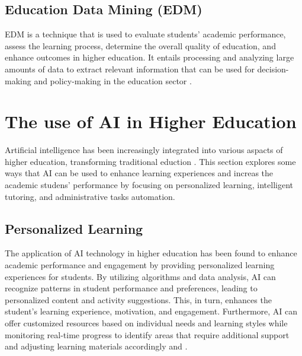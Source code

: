 \subsection{Education Data Mining (EDM)}
EDM is a technique that is used to evaluate students' academic performance,
assess the learning process, determine the overall quality of education, and enhance outcomes in higher education.
It entails processing and analyzing large amounts of data to extract relevant information that can be used for
decision-making and policy-making in the education sector \citep{arifin_using_2022}.


\section{The use of AI in Higher Education }\label{use-ai}
\justifying
Artificial intelligence has been increasingly integrated into various aspacts of higher
education, transforming traditional eduction \citep{wang_exploring_2023}. This section explores
some ways that AI can be used to enhance learning experiences and increas the academic studens' performance
by focusing on  personalized learning, intelligent tutoring, and administrative tasks automation.

\subsection{Personalized Learning}
The application of AI technology in higher education has been found to enhance academic performance and
engagement by providing personalized learning experiences for students. By utilizing algorithms and
data analysis, AI can recognize patterns in student performance and preferences, leading to personalized
content and activity suggestions. This, in turn, enhances the student's learning experience, motivation,
and engagement. Furthermore, AI can offer customized resources based on individual needs and learning styles
while monitoring real-time progress to identify areas that require additional support and adjusting learning
materials accordingly
\citep{guerrero-quinonez_artificial_2023} and \citep{l_d_of_cs_akshara_first_grade_college_2023}.



